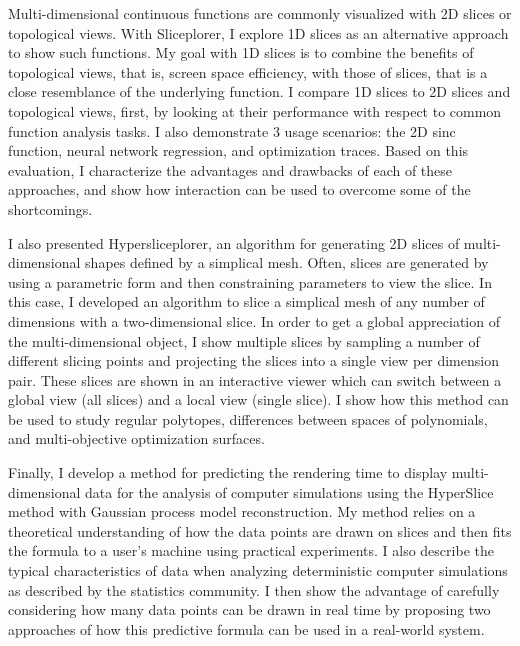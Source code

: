 

Multi-dimensional continuous functions are commonly visualized with 2D slices
or topological views. With Sliceplorer, I explore 1D slices as an alternative
approach to show such functions. My goal with 1D slices is to combine the
benefits of topological views, that is, screen space efficiency, with those of
slices, that is a close resemblance of the underlying function.  I compare 1D
slices to 2D slices and topological views, first, by looking at their
performance with respect to common function analysis tasks. I also demonstrate
3 usage scenarios: the 2D sinc function, neural network regression, and
optimization traces. Based on this evaluation, I characterize the advantages
and drawbacks of each of these approaches, and show how interaction can be used
to overcome some of the shortcomings. 


I also presented Hypersliceplorer, an algorithm for generating 2D
slices of multi-dimensional shapes defined by a simplical mesh.  Often, slices
are generated by using a parametric form and then constraining parameters to
view the slice. In this case, I developed an algorithm to slice a simplical
mesh of any number of dimensions with a two-dimensional slice. In order to get
a global appreciation of the multi-dimensional object, I show multiple slices
by sampling a number of different slicing points and projecting the slices into
a single view per dimension pair. These slices are shown in an interactive
viewer which can switch between a global view (all slices) and a local view
(single slice). I show how this method can be used to study regular polytopes,
differences between spaces of polynomials, and multi-objective optimization
surfaces. 


Finally, I develop a method for predicting the rendering time to display
multi-dimensional data for the analysis of computer simulations using the
HyperSlice~\cite{Wijk:1993} method with Gaussian process model reconstruction.
My method relies on a theoretical understanding of how the data points are
drawn on slices and then fits the formula to a user's machine using practical
experiments.  I also describe the typical characteristics of data when
analyzing deterministic computer simulations as described by the statistics
community.  I then show the advantage of carefully considering how many data
points can be drawn in real time by proposing two approaches of how this
predictive formula can be used in a real-world system.


